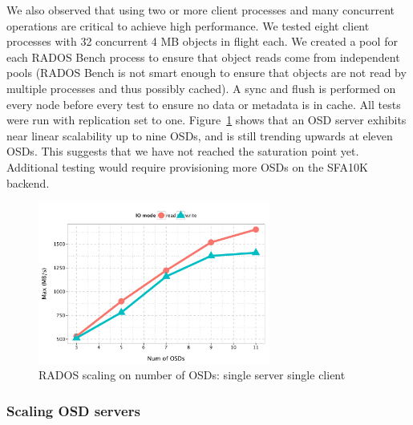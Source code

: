 We also observed that using two or more client processes and many concurrent
operations are critical to achieve high performance.  We tested eight client
processes with 32 concurrent 4 MB objects in flight each. We created a pool
for each RADOS Bench process to ensure that object reads come from independent
pools (RADOS Bench is not smart enough to ensure that objects are not read by
multiple processes and thus possibly cached).  A sync and flush is performed
on every node before every test to ensure no data or metadata is in cache.
All tests were run with replication set to one. Figure~\ref{fig:osd-scale}
shows that an OSD server exhibits near linear scalability up to
nine OSDs, and is still trending upwards at eleven OSDs. This suggests that we
have not reached the saturation point yet. Additional testing would require
provisioning more OSDs on the SFA10K backend.
%


\begin{figure}[htb]
\centering
\includegraphics[width=3in]{data/rados_osd}
\caption{RADOS scaling on number of OSDs: single server single client}
\label{fig:osd-scale}
\end{figure}

\subsubsection{Scaling OSD servers}

